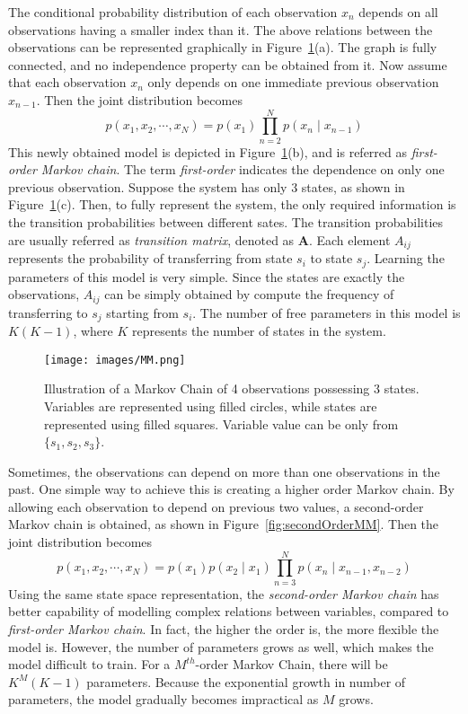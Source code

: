 The conditional probability distribution of each observation \(x_n\) depends on all observations having a smaller index than it. The above relations between the observations can be represented graphically in Figure~\ref{fig:MM}(a). The graph is fully connected, and no independence property can be obtained from it. Now assume that each observation \(x_n\) only depends on one immediate previous observation \(x_{n-1}\). Then the joint distribution becomes 
\begin{equation}
	p(x_1, x_2, \cdots, x_N) = p(x_1)\prod_{n = 2}^{N} p(x_n \mid x_{n-1})
\end{equation}
This newly obtained model is depicted in Figure~\ref{fig:MM}(b), and is referred as \textit{first-order Markov chain}. The term \textit{first-order} indicates the dependence on only one previous observation. Suppose the system has only 3 states, as shown in Figure~\ref{fig:MM}(c). Then, to fully represent the system, the only required information is the transition probabilities between different sates. The transition probabilities are usually referred as \textit{transition matrix}, denoted as \(\mathbf{A}\). Each element \(A_{ij}\) represents the probability of transferring from state \(s_i\) to state \(s_j\). Learning the parameters of this model is very simple. Since the states are exactly the observations, \(A_{ij}\) can be simply obtained by compute the frequency of transferring to \(s_j\) starting from \(s_i\). The number of free parameters in this model is \(K(K-1)\), where \(K\) represents the number of states in the system.

\begin{figure}[!ht]
	\begin{center}
		\texttt{[image: images/MM.png]}
		\caption{Illustration of a Markov Chain of 4 observations possessing 3 states. Variables are represented using filled circles, while states are represented using filled squares. Variable value can be only from $\{s_1, s_2, s_3\}$.}
		\label{fig:MM}
	\end{center}
\end{figure}

Sometimes, the observations can depend on more than one observations in the past. One simple way to achieve this is creating a higher order Markov chain. By allowing each observation to depend on previous two values, a second-order Markov chain is obtained, as shown in Figure~\ref{fig:secondOrderMM}. Then the joint distribution becomes
\begin{equation}
	p(x_1, x_2, \cdots, x_N) = p(x_1)p(x_2 \mid x_1)\prod_{n = 3}^{N} p(x_n \mid x_{n-1}, x_{n-2})
\end{equation}
Using the same state space representation, the \textit{second-order Markov chain} has better capability of modelling complex relations between variables, compared to \textit{first-order Markov chain}. In fact, the higher the order is, the more flexible the model is. However, the number of parameters grows as well, which makes the model difficult to train. For a \(M^{th}\)-order Markov Chain, there will be \(K^{M}(K-1)\) parameters. Because the exponential growth in number of parameters, the model gradually becomes impractical as \(M\) grows. 

